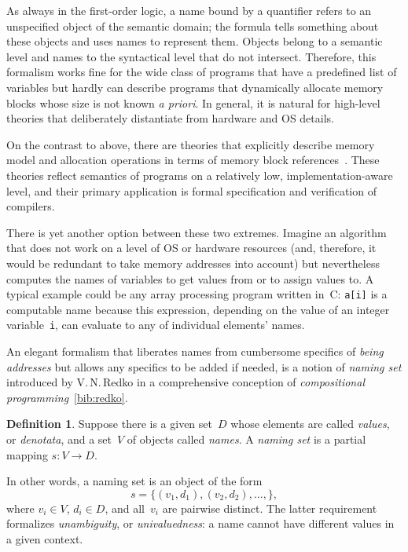 \documentclass{article}
\theoremstyle{definition}
\newtheorem{Df}{Definition}
\begin{document}
As always in the first-order logic, a name bound by a quantifier refers to an
unspecified object of the semantic domain; the formula tells something about
these objects and uses names to represent them.  Objects belong to a semantic
level and names to the syntactical level that do not intersect.  Therefore,
this formalism works fine for the wide class of programs that have a predefined
list of variables but hardly can describe programs that dynamically allocate
memory blocks whose size is not known \emph{a priori}.  In general, it is
natural for high-level theories that deliberately distantiate from hardware and
OS details.

On the contrast to above, there are theories that explicitly describe memory
model and allocation operations in terms of memory block
references~\cite{bib:leroy}.  These theories reflect semantics of programs on a
relatively low, implementation-aware level, and their primary application is
formal specification and verification of compilers.

There is yet another option between these two extremes. Imagine an algorithm
that does not work on a level of OS or hardware resources (and, therefore, it
would be redundant to take memory addresses into account) but nevertheless
computes the names of variables to get values from or to assign values to. A
typical example could be any array processing program written in~C:
\lstinline{a[i]} is a computable name because this expression, depending on the
value of an integer variable~\lstinline{i}, can evaluate to any of individual
elements' names.

An elegant formalism that liberates names from cumbersome specifics of
\emph{being addresses} but allows any specifics to be added if needed,
is a notion of \emph{naming set} introduced by V.\,N.\,Redko in a
comprehensive conception of \emph{compositional programming}~\ref{bib:redko}.

\begin{Df}\label{df:naming-set}
Suppose there is a given set~$D$ whose elements are called \emph{values}, or
\emph{denotata}, and a set~$V$ of objects called \emph{names}.
A \emph{naming set} is a partial mapping $s: V\to D$.
\end{Df}

In other words, a naming set is an object of the form
\[
  s = \{ (v_1, d_1), (v_2, d_2), \ldots, \} ,
\]
where $v_i\in V$, $d_i\in D$, and all~$v_i$ are pairwise distinct. The
latter requirement formalizes \emph{unambiguity}, or \emph{univaluedness}: a
name cannot have different values in a given context.
\end{document}
